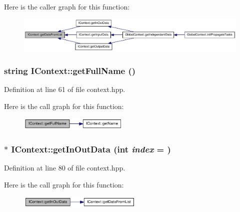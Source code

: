 Here is the caller graph for this function:\nopagebreak
\begin{figure}[H]
\begin{center}
\leavevmode
\includegraphics[width=377pt]{class_i_context_a63b80af186cfc16907b72e8fdb3a7f11_icgraph}
\end{center}
\end{figure}
\hypertarget{class_i_context_a6a8cf9340093917ffb41f8d812c26884}{
\subsubsection[{getFullName}]{\setlength{\rightskip}{0pt plus 5cm}string IContext::getFullName ()}}
\label{class_i_context_a6a8cf9340093917ffb41f8d812c26884}


Definition at line 61 of file context.hpp.

Here is the call graph for this function:\nopagebreak
\begin{figure}[H]
\begin{center}
\leavevmode
\includegraphics[width=148pt]{class_i_context_a6a8cf9340093917ffb41f8d812c26884_cgraph}
\end{center}
\end{figure}
\hypertarget{class_i_context_ab62e24ee67cb0f7355a0671afd0cbe10}{
\subsubsection[{getInOutData}]{$\ast$ IContext::getInOutData (int {\em index} = {})}}
\label{class_i_context_ab62e24ee67cb0f7355a0671afd0cbe10}


Definition at line 80 of file context.hpp.

Here is the call graph for this function:\nopagebreak
\begin{figure}[H]
\begin{center}
\leavevmode
\includegraphics[width=167pt]{class_i_context_ab62e24ee67cb0f7355a0671afd0cbe10_cgraph}
\end{center}
\end{figure}



